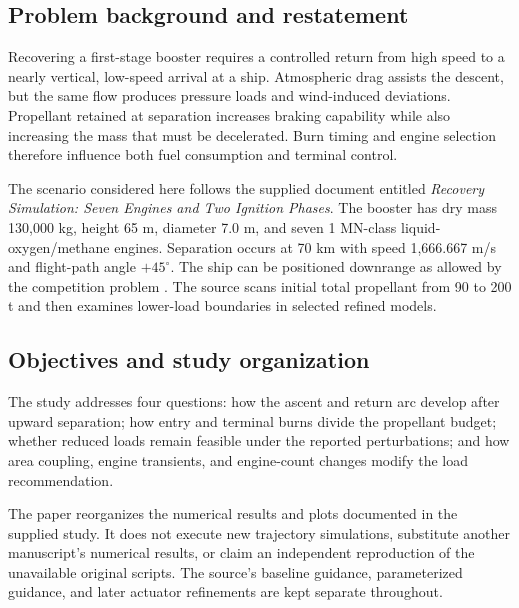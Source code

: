 \documentclass[11pt,a4paper]{article}
\begin{document}
\subsection{Problem background and restatement}
Recovering a first-stage booster requires a controlled return from high speed to a nearly vertical, low-speed arrival at a ship. Atmospheric drag assists the descent, but the same flow produces pressure loads and wind-induced deviations. Propellant retained at separation increases braking capability while also increasing the mass that must be decelerated. Burn timing and engine selection therefore influence both fuel consumption and terminal control.

The scenario considered here follows the supplied document entitled \emph{Recovery Simulation: Seven Engines and Two Ignition Phases}. The booster has dry mass 130,000 kg, height 65 m, diameter 7.0 m, and seven 1 MN-class liquid-oxygen/methane engines. Separation occurs at 70 km with speed 1,666.667 m/s and flight-path angle $+45^\circ$. The ship can be positioned downrange as allowed by the competition problem \cite{problem}. The source scans initial total propellant from 90 to 200 t and then examines lower-load boundaries in selected refined models.

\subsection{Objectives and study organization}
The study addresses four questions: how the ascent and return arc develop after upward separation; how entry and terminal burns divide the propellant budget; whether reduced loads remain feasible under the reported perturbations; and how area coupling, engine transients, and engine-count changes modify the load recommendation.

The paper reorganizes the numerical results and plots documented in the supplied study. It does not execute new trajectory simulations, substitute another manuscript's numerical results, or claim an independent reproduction of the unavailable original scripts. The source's baseline guidance, parameterized guidance, and later actuator refinements are kept separate throughout.
\end{document}
